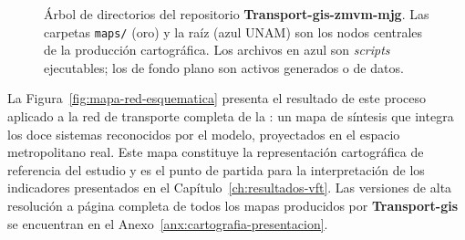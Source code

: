 \begin{figure}[htbp]
\centering

\caption[Estructura de directorios de Transport-gis-zmvm-mjg]%
  {Árbol de directorios del repositorio \textbf{Transport-gis-zmvm-mjg}. Las carpetas \texttt{maps/} (oro) y la raíz (azul UNAM)
  son los nodos centrales de la producción cartográfica. Los archivos en azul son \textit{scripts} ejecutables;
  los de fondo plano son activos generados o de datos.}
\label{fig:tg-arbol}
\end{figure}

La Figura~\ref{fig:mapa-red-esquematica} presenta el resultado de este proceso aplicado a la red de transporte completa de la \zmvm{}:
un mapa de síntesis que integra los doce sistemas reconocidos por el modelo, proyectados en el espacio metropolitano real. Este mapa
constituye la representación cartográfica de referencia del estudio y es el punto de partida para la interpretación de los indicadores
presentados en el Capítulo~\ref{ch:resultados-vft}. Las versiones de alta resolución a página completa de todos los mapas producidos
por \textbf{Transport-gis} se encuentran en el Anexo~\ref{anx:cartografia-presentacion}.

